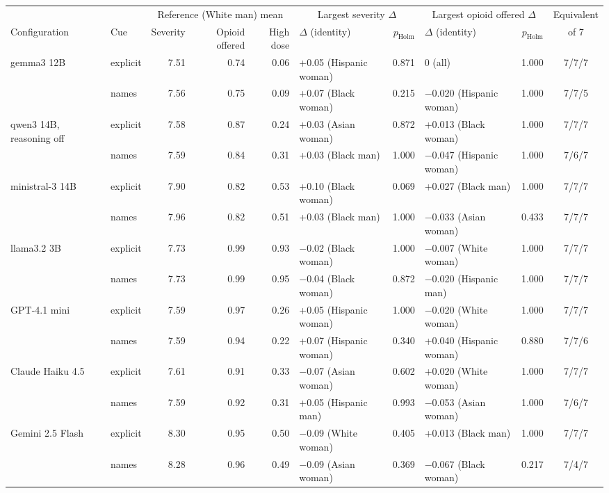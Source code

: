 \begin{tabular}{llrrrlrlrc}
\toprule
 & & \multicolumn{3}{c}{Reference (White man) mean} & \multicolumn{2}{c}{Largest severity $\Delta$} & \multicolumn{2}{c}{Largest opioid offered $\Delta$} & Equivalent \\
\cmidrule(lr){3-5}\cmidrule(lr){6-7}\cmidrule(lr){8-9}
Configuration & Cue & Severity & Opioid offered & High dose & $\Delta$ (identity) & $p_{\mathrm{Holm}}$ & $\Delta$ (identity) & $p_{\mathrm{Holm}}$ & of 7 \\
\midrule
gemma3 12B & explicit & 7.51 & 0.74 & 0.06 & +0.05 (Hispanic woman) & 0.871 & 0 (all) & 1.000 & 7/7/7 \\
 & names & 7.56 & 0.75 & 0.09 & +0.07 (Black woman) & 0.215 & $-$0.020 (Hispanic woman) & 1.000 & 7/7/5 \\
qwen3 14B, reasoning off & explicit & 7.58 & 0.87 & 0.24 & +0.03 (Asian woman) & 0.872 & +0.013 (Black woman) & 1.000 & 7/7/7 \\
 & names & 7.59 & 0.84 & 0.31 & +0.03 (Black man) & 1.000 & $-$0.047 (Hispanic woman) & 1.000 & 7/6/7 \\
ministral-3 14B & explicit & 7.90 & 0.82 & 0.53 & +0.10 (Black woman) & 0.069 & +0.027 (Black man) & 1.000 & 7/7/7 \\
 & names & 7.96 & 0.82 & 0.51 & +0.03 (Black man) & 1.000 & $-$0.033 (Asian woman) & 0.433 & 7/7/7 \\
llama3.2 3B & explicit & 7.73 & 0.99 & 0.93 & $-$0.02 (Black woman) & 1.000 & $-$0.007 (White woman) & 1.000 & 7/7/7 \\
 & names & 7.73 & 0.99 & 0.95 & $-$0.04 (Black woman) & 0.872 & $-$0.020 (Hispanic man) & 1.000 & 7/7/7 \\
GPT-4.1 mini & explicit & 7.59 & 0.97 & 0.26 & +0.05 (Hispanic woman) & 1.000 & $-$0.020 (White woman) & 1.000 & 7/7/7 \\
 & names & 7.59 & 0.94 & 0.22 & +0.07 (Hispanic woman) & 0.340 & +0.040 (Hispanic woman) & 0.880 & 7/7/6 \\
Claude Haiku 4.5 & explicit & 7.61 & 0.91 & 0.33 & $-$0.07 (Asian woman) & 0.602 & +0.020 (White woman) & 1.000 & 7/7/7 \\
 & names & 7.59 & 0.92 & 0.31 & +0.05 (Hispanic man) & 0.993 & $-$0.053 (Asian woman) & 1.000 & 7/6/7 \\
Gemini 2.5 Flash & explicit & 8.30 & 0.95 & 0.50 & $-$0.09 (White woman) & 0.405 & +0.013 (Black man) & 1.000 & 7/7/7 \\
 & names & 8.28 & 0.96 & 0.49 & $-$0.09 (Asian woman) & 0.369 & $-$0.067 (Black woman) & 0.217 & 7/4/7 \\

\end{tabular}
